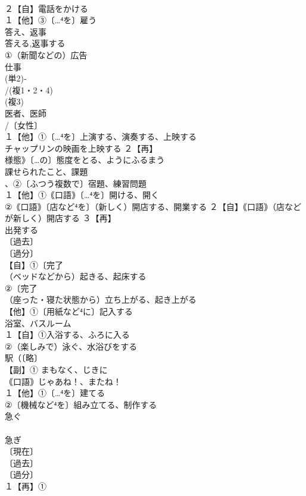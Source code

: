 \documentclass[8pt]{extreport}
\begin{document}
\begin{CJK}{UTF8}{min}
\\	２【自】電話をかける
\\	１【他】③〔…⁴を〕雇う
\\	答え、返事
\\	答える,返事する
\\	①（新聞などの）広告
\\	仕事
\\	(単2)‐
\\	/(複1・2・4)
\\	(複3)
\\	医者、医師
\\	/〔女性〕
\\	１【他】①〔…⁴を〕上演する、演奏する、上映する
\\	チャップリンの映画を上映する ２【再】
\\	様態》〔…の〕態度をとる、ようにふるまう
\\	課せられたこと、課題
\\	、②〔ふつう複数で〕宿題、練習問題
\\	１【他】①｟口語｠〔…⁴を〕開ける、開く
\\	②｟口語｠〔店など⁴を〕（新しく）開店する、開業する ２【自】｟口語｠（店などが新しく）開店する ３【再】
\\	出発する
\\	〔過去〕
\\	〔過分〕
\\	【自】①〔完了
\\	（ベッドなどから）起きる、起床する
\\	②〔完了
\\	（座った・寝た状態から）立ち上がる、起き上がる
\\	【他】①〔用紙など⁴に〕記入する
\\	浴室、バスルーム
\\	１【自】①入浴する、ふろに入る
\\	②（楽しみで）泳ぐ、水浴びをする
\\	駅（〔略〕
\\	【副】① まもなく、じきに
\\	｟口語｠じゃあね！、またね！
\\	１【他】①〔…⁴を〕建てる
\\	②〔機械など⁴を〕組み立てる、制作する
\\	急ぐ 
\\	[派生] 
\\	急ぎ
\\	〔現在〕
\\	〔過去〕
\\	〔過分〕
\\	１【再】①

\end{CJK}
\end{document}
